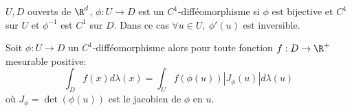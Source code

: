 \begin{rappel}
	$U, D$ ouverts de $\R^d$, $\phi : U \to D$ est un $C^1$-difféomorphisme si $\phi$ est bijective et $C^1$ sur $U$ et $\phi^{-1}$ est $C^1$ sur $D$.
	Dans ce cas $\forall u \in U, \ \phi'(u)$ est inversible.
\end{rappel}


\begin{theorem}
	Soit $\phi: U \to D$ un $C^1$-difféomorphisme alors pour toute fonction $f : D \to \R^+$mesurable positive:
	$$\int_D f(x) d\lambda(x) = \int_U f(\phi(u)) |J_\phi (u)| d \lambda (u) $$
	où $J_\phi =\det(\phi(u))$ est le jacobien de $\phi$ en $u$.
\end{theorem}


